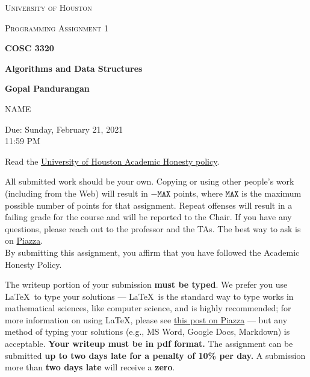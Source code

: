 \documentclass[final]{article}
\begin{document}
\begin{titlepage}
    \begin{center}
        {\scshape\LARGE University of Houston\par}
        \vspace{1cm}
        {\scshape\Large Programming Assignment 1 \par}
        \vspace{1.5cm}
        {\huge\bfseries COSC 3320 \par}
        {\huge\bfseries Algorithms and Data Structures \par}
        \vspace{0.5cm}
        {\large\bfseries Gopal Pandurangan\par}
        \vspace{2cm}
        {\Large NAME\par}
        \vspace{0.5cm}
        {\large \par} Due: Sunday, February 21, 2021\\11:59 PM
    \end{center}


    Read the \href{https://www.uh.edu/provost/policies-resources/honesty/_documents-honesty/academic-honesty-policy.pdf}{University of Houston Academic Honesty policy}.

    \begin{tcolorbox}[title=Academic Honesty Policy,colback=red!15,colframe=red!65!black,fonttitle=\bfseries]All submitted work should be your own. Copying or using other people's work (including from the Web) will result in \(-\texttt{MAX}\) points, where \(\texttt{MAX}\) is the maximum possible number of points for that assignment. Repeat offenses will result in a failing grade for the course and will be reported to the Chair. If you have any questions, please reach out to the professor and the TAs. The best way to ask is on \href{https://piazza.com/uh/spring2021/cosc3320/home}{Piazza}.\\

        By submitting this assignment, you affirm that you have followed the Academic Honesty Policy.
    \end{tcolorbox}

    The writeup portion of your submission \textbf{must be typed}. We prefer you use \LaTeX~to type your solutions --- \LaTeX~is the standard way to type works in mathematical sciences, like computer science, and is highly recommended; for more information on using \LaTeX, please see \href{https://piazza.com/class/kjxhee6ctqe6cj?cid=8}{this post on Piazza} --- but any method of typing your solutions (e.g., MS Word, Google Docs, Markdown) is acceptable. \textbf{Your writeup must be in pdf format.} The assignment can be submitted \textbf{up to two days late for a penalty of 10\% per day.} A submission more than \textbf{two days late} will receive a \textbf{zero}.


\end{titlepage}
\end{document}
